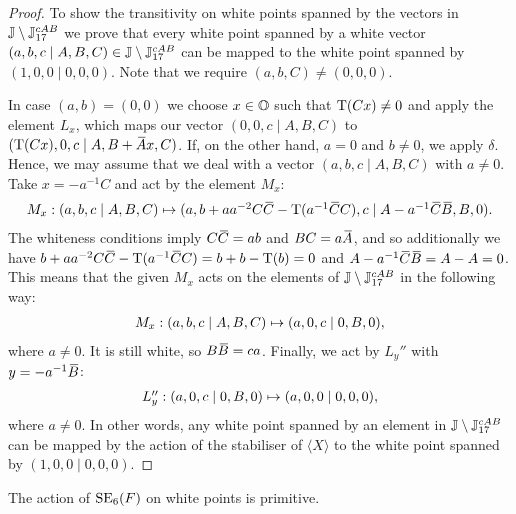 \begin{proof}
	 To show the transitivity on white points spanned by the vectors in 
	 $\mathbb{J}\setminus \mathbb{J}_{17}^{cAB}$ we prove that every white point 
	 spanned by a white vector $(a,b,c\mid A,B,C)\in \mathbb{J}\setminus \mathbb{J}_{17}^{cAB}$ 
	 can be mapped to the white point spanned by $(1,0,0\mid 0,0,0)$. Note that
	 we require $(a,b,C) \neq (0,0,0)$. 
	 
	 In case $(a,b) = (0,0)$ we choose $x\in \mathbb{O}$ such that $\operatorname{T}(Cx) \neq 0$ and
	 apply the element $L_x$, which maps our vector $(0,0,c\mid A,B,C)$ to
	 $(\operatorname{T}(Cx),0,c\mid A,B+\mathord{\mbox{\hspace*{0pt}}\,\overline{\!A\!\!\;}\!\:}\mbox{\hspace*{0pt}} x,C)$. If, on the other hand, $a = 0$ and 
	 $b \neq 0$, we apply $\delta$. Hence, we may assume that we deal with a vector
	 $(a,b,c\mid A,B,C)$ with $a \neq 0$. Take $x = -a^{-1}C$ and act by the element
	 $M_x$: 
	 \begin{equation*}
	 	\begin{array}{r@{\;}c@{\;}l}
	 		M_x : (a,b,c\mid A,B,C) & \mapsto & 
	 				(a,b+ aa^{-2} C\ovC - \Tr(a^{-1}\ovC C),c \mid 
	 						A - a^{-1}\ovC \ovB, B, 0).
	 	\end{array}
	 \end{equation*}
	 The whiteness conditions imply $C\mathord{\mbox{\hspace*{0pt}}\,\overline{\!C\!\!\;}\!\:}\mbox{\hspace*{0pt}} = ab$ and $BC = a\mathord{\mbox{\hspace*{0pt}}\,\overline{\!A\!\!\;}\!\:}\mbox{\hspace*{0pt}}$, and so additionally we have 
	 \mbox{$b+ aa^{-2} C\ovC - \Tr(a^{-1}\ovC C) = b+b-\Tr(b) = 0$} and 
	 $A - a^{-1}\ovC \ovB = A - A = 0$. This means that the given $M_x$ acts on the elements
	 of $\mathbb{J}\setminus \mathbb{J}_{17}^{cAB}$ in the following way:
	 \begin{equation*}
	 	\begin{array}{r@{\;}c@{\;}l}
	 		M_x : (a,b,c\mid A,B,C) & \mapsto & 
	 				(a,0,c \mid 
	 						0, B, 0),
	 	\end{array}
	 \end{equation*}
	 where $a\neq 0$. It is still white, so $B\mathord{\mbox{\hspace*{0pt}}\,\overline{\!B\!\!\;}\!\:}\mbox{\hspace*{0pt}} = ca$.
	 Finally, we act by $L_y''$ with $y = -a^{-1}\mathord{\mbox{\hspace*{0pt}}\,\overline{\!B\!\!\;}\!\:}\mbox{\hspace*{0pt}}$:
	 \begin{equation*}
	 	\begin{array}{r@{\;}c@{\;}l}
	 		L_y'': (a,0,c\mid 0,B,0) & \mapsto & 
	 			(a,0,0 \mid 0,0,0), 
	 	\end{array}
	 \end{equation*}
	 where $a \neq 0$. In other words, any white point spanned by an element
	 in $\mathbb{J}\setminus\mathbb{J}_{17}^{cAB}$ can be mapped by the action of the stabiliser
	 of $\langle X\rangle$ to the white point spanned by $(1,0,0\mid 0,0,0)$. 
\end{proof}

\begin{lemma}
	\label{lemma:1_white_primitive}
	The action of $\mathrm{SE}_6(F)$ on white points is primitive.
\end{lemma}

